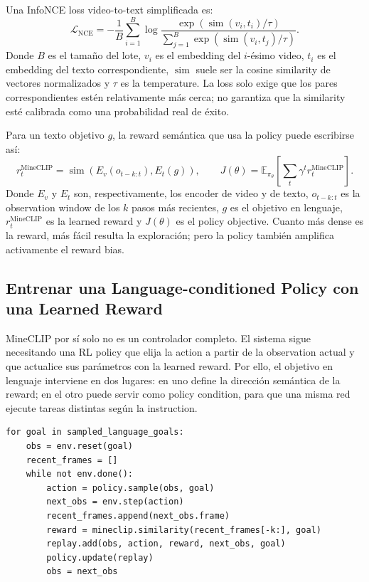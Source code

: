 Una InfoNCE loss video-to-text simplificada es:
\[
\mathcal{L}_{\mathrm{NCE}}
=-\frac{1}{B}\sum_{i=1}^{B}
\log\frac{\exp(\operatorname{sim}(v_i,t_i)/\tau)}
{\sum_{j=1}^{B}\exp(\operatorname{sim}(v_i,t_j)/\tau)}.
\]
Donde $B$ es el tamaño del lote, $v_i$ es el embedding del $i$-ésimo video, $t_i$ es el embedding del texto correspondiente, $\operatorname{sim}$ suele ser la cosine similarity de vectores normalizados y $\tau$ es la temperature. La loss solo exige que los pares correspondientes estén relativamente más cerca; no garantiza que la similarity esté calibrada como una probabilidad real de éxito.

Para un texto objetivo $g$, la reward semántica que usa la policy puede escribirse así:
\[
r_t^{\text{MineCLIP}}=\operatorname{sim}\!\left(E_v(o_{t-k:t}),E_t(g)\right),
\qquad
J(\theta)=\mathbb{E}_{\pi_\theta}\left[\sum_t\gamma^t r_t^{\text{MineCLIP}}\right].
\]
Donde $E_v$ y $E_t$ son, respectivamente, los encoder de video y de texto, $o_{t-k:t}$ es la observation window de los $k$ pasos más recientes, $g$ es el objetivo en lenguaje, $r_t^{\text{MineCLIP}}$ es la learned reward y $J(\theta)$ es el policy objective. Cuanto más dense es la reward, más fácil resulta la exploración; pero la policy también amplifica activamente el reward bias.

\subsection{Entrenar una Language-conditioned Policy con una Learned Reward}

MineCLIP por sí solo no es un controlador completo. El sistema sigue necesitando una RL policy que elija la action a partir de la observation actual y que actualice sus parámetros con la learned reward. Por ello, el objetivo en lenguaje interviene en dos lugares: en uno define la dirección semántica de la reward; en el otro puede servir como policy condition, para que una misma red ejecute tareas distintas según la instruction.


\begin{lstlisting}[caption={Pseudocódigo conceptual del ciclo de entrenamiento de RL condicionado por MineCLIP}]
for goal in sampled_language_goals:
    obs = env.reset(goal)
    recent_frames = []
    while not env.done():
        action = policy.sample(obs, goal)
        next_obs = env.step(action)
        recent_frames.append(next_obs.frame)
        reward = mineclip.similarity(recent_frames[-k:], goal)
        replay.add(obs, action, reward, next_obs, goal)
        policy.update(replay)
        obs = next_obs
\end{lstlisting}

